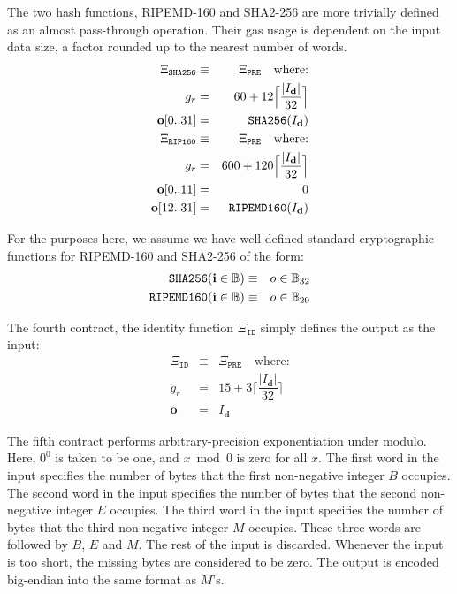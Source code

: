 \documentclass[9pt,oneside]{amsart}
\begin{document}
The two hash functions, RIPEMD-160 and SHA2-256 are more trivially defined as an almost pass-through operation. Their gas usage is dependent on the input data size, a factor rounded up to the nearest number of words.
\begin{eqnarray}
\Xi_{\mathtt{SHA256}} &\equiv& \Xi_{\mathtt{PRE}} \quad \text{where:} \\
g_r &=& 60 + 12\Big\lceil \dfrac{|I_\mathbf{d}|}{32} \Big\rceil\\
\mathbf{o}[0..31] &=& \mathtt{\tiny SHA256}(I_\mathbf{d})\\
\Xi_{\mathtt{RIP160}} &\equiv& \Xi_{\mathtt{PRE}} \quad \text{where:} \\
g_r &=& 600 + 120\Big\lceil \dfrac{|I_\mathbf{d}|}{32} \Big\rceil\\
\mathbf{o}[0..11] &=& 0 \\
\mathbf{o}[12..31] &=& \mathtt{\tiny RIPEMD160}(I_\mathbf{d})\\
\end{eqnarray}

For the purposes here, we assume we have well-defined standard cryptographic functions for RIPEMD-160 and SHA2-256 of the form:
\begin{eqnarray}
\mathtt{\small SHA256}(\mathbf{i} \in \mathbb{B}) & \equiv & o \in \mathbb{B}_{32} \\
\mathtt{\small RIPEMD160}(\mathbf{i} \in \mathbb{B}) & \equiv & o \in \mathbb{B}_{20}
\end{eqnarray}

The fourth contract, the identity function $\Xi_{\mathtt{ID}}$ simply defines the output as the input:
\begin{eqnarray}
\Xi_{\mathtt{ID}} &\equiv& \Xi_{\mathtt{PRE}} \quad \text{where:} \\
g_r &=& 15 + 3\Big\lceil \dfrac{|I_\mathbf{d}|}{32} \Big\rceil\\
\mathbf{o} &=& I_\mathbf{d}
\end{eqnarray}

The fifth contract performs arbitrary-precision exponentiation under modulo. Here, $0 ^ 0$ is taken to be one, and $x \bmod 0$ is zero for all $x$. The first word in the input specifies the number of bytes that the first non-negative integer $B$ occupies. The second word in the input specifies the number of bytes that the second non-negative integer $E$ occupies. The third word in the input specifies the number of bytes that the third non-negative integer $M$ occupies. These three words are followed by $B$, $E$ and $M$. The rest of the input is discarded. Whenever the input is too short, the missing bytes are considered to be zero. The output is encoded big-endian into the same format as $M$'s.
\end{document}
